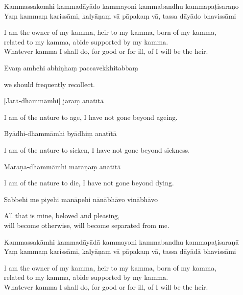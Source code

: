 Kammassakomhi kammadāyādo kammayoni kammabandhu kammapaṭisaraṇo\\
Yaṃ kammaṃ karissāmi, kalyāṇaṃ vā pāpakaṃ vā, tassa dāyādo bhavissāmi

\begin{english}
  I am the owner of my kamma, heir to my kamma, born of my kamma,\\
  related to my kamma, abide supported by my kamma.\\
  Whatever kamma I shall do, for good or for ill, of  I will be the heir.
\end{english}

Evaṃ amhehi abhiṇhaṃ paccavekkhitabbaṃ

\begin{english}
   we should frequently recollect.
\end{english}


[Jarā-dhammāmhi] jaraṃ anatītā

\begin{english}
  I am of the nature to age, I have not gone beyond ageing.
\end{english}

Byādhi-dhammāmhi byādhiṃ anatītā

\begin{english}
  I am of the nature to sicken, I have not gone beyond sickness.
\end{english}

Maraṇa-dhammāmhi maraṇaṃ anatītā

\begin{english}
  I am of the nature to die, I have not gone beyond dying.
\end{english}

Sabbehi me piyehi manāpehi nānābhāvo vinābhāvo

\begin{english}
  All that is mine, beloved and pleasing,\\
  will become otherwise, will become separated from me.
\end{english}

Kammassakāmhi kammadāyādā kammayoni kammabandhu kammapaṭisaraṇā\\
Yaṃ kammaṃ karissāmi, kalyāṇaṃ vā pāpakaṃ vā, tassa dāyādā bhavissāmi

\begin{english}
  I am the owner of my kamma, heir to my kamma, born of my kamma,\\
  related to my kamma, abide supported by my kamma.\\
  Whatever kamma I shall do, for good or for ill, of  I will be the heir.
\end{english}

